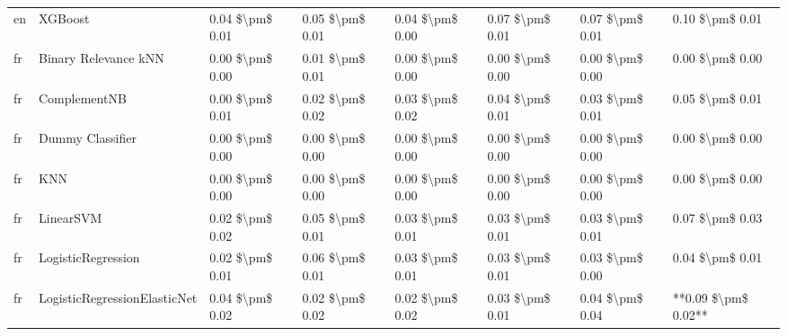 \begin{tabular}{llllllll}
      en &                         XGBoost & 0.04 \$\textbackslash pm\$ 0.01 &           0.05 \$\textbackslash pm\$ 0.01 &       0.04 \$\textbackslash pm\$ 0.00 &        0.07 \$\textbackslash pm\$ 0.01 &                         0.07 \$\textbackslash pm\$ 0.01 &     0.10 \$\textbackslash pm\$ 0.01 \\
      fr &            Binary Relevance kNN & 0.00 \$\textbackslash pm\$ 0.00 &           0.01 \$\textbackslash pm\$ 0.01 &       0.00 \$\textbackslash pm\$ 0.00 &        0.00 \$\textbackslash pm\$ 0.00 &                         0.00 \$\textbackslash pm\$ 0.00 &     0.00 \$\textbackslash pm\$ 0.00 \\
      fr &                    ComplementNB & 0.00 \$\textbackslash pm\$ 0.01 &           0.02 \$\textbackslash pm\$ 0.02 &       0.03 \$\textbackslash pm\$ 0.02 &        0.04 \$\textbackslash pm\$ 0.01 &                         0.03 \$\textbackslash pm\$ 0.01 &     0.05 \$\textbackslash pm\$ 0.01 \\
      fr &                Dummy Classifier & 0.00 \$\textbackslash pm\$ 0.00 &           0.00 \$\textbackslash pm\$ 0.00 &       0.00 \$\textbackslash pm\$ 0.00 &        0.00 \$\textbackslash pm\$ 0.00 &                         0.00 \$\textbackslash pm\$ 0.00 &     0.00 \$\textbackslash pm\$ 0.00 \\
      fr &                             KNN & 0.00 \$\textbackslash pm\$ 0.00 &           0.00 \$\textbackslash pm\$ 0.00 &       0.00 \$\textbackslash pm\$ 0.00 &        0.00 \$\textbackslash pm\$ 0.00 &                         0.00 \$\textbackslash pm\$ 0.00 &     0.00 \$\textbackslash pm\$ 0.00 \\
      fr &                       LinearSVM & 0.02 \$\textbackslash pm\$ 0.02 &           0.05 \$\textbackslash pm\$ 0.01 &       0.03 \$\textbackslash pm\$ 0.01 &        0.03 \$\textbackslash pm\$ 0.01 &                         0.03 \$\textbackslash pm\$ 0.01 &     0.07 \$\textbackslash pm\$ 0.03 \\
      fr &              LogisticRegression & 0.02 \$\textbackslash pm\$ 0.01 &           0.06 \$\textbackslash pm\$ 0.01 &       0.03 \$\textbackslash pm\$ 0.01 &        0.03 \$\textbackslash pm\$ 0.01 &                         0.03 \$\textbackslash pm\$ 0.00 &     0.04 \$\textbackslash pm\$ 0.01 \\
      fr &    LogisticRegressionElasticNet & 0.04 \$\textbackslash pm\$ 0.02 &           0.02 \$\textbackslash pm\$ 0.02 &       0.02 \$\textbackslash pm\$ 0.02 &        0.03 \$\textbackslash pm\$ 0.01 &                         0.04 \$\textbackslash pm\$ 0.04 & **0.09 \$\textbackslash pm\$ 0.02** \\

\end{tabular}
